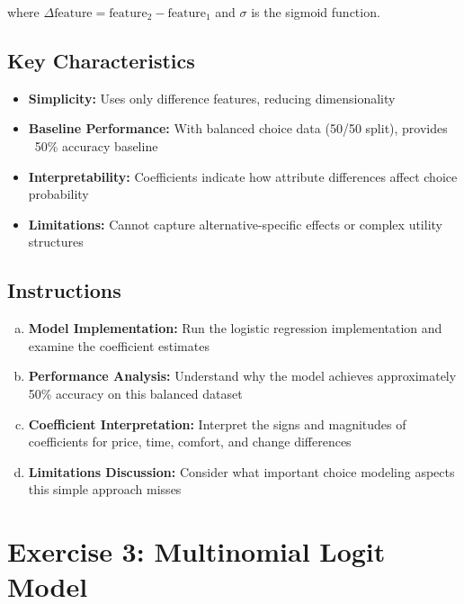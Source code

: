 \documentclass[11pt]{article}
\begin{document}
where $\Delta\text{feature} = \text{feature}_2 - \text{feature}_1$ and $\sigma$ is the sigmoid function.

\subsection*{Key Characteristics}

\begin{itemize}
\item \textbf{Simplicity:} Uses only difference features, reducing dimensionality
\item \textbf{Baseline Performance:} With balanced choice data (50/50 split), provides ~50\% accuracy baseline
\item \textbf{Interpretability:} Coefficients indicate how attribute differences affect choice probability
\item \textbf{Limitations:} Cannot capture alternative-specific effects or complex utility structures
\end{itemize}

\subsection*{Instructions}

\begin{enumerate}[(a)]
\item \textbf{Model Implementation:} Run the logistic regression implementation and examine the coefficient estimates
\item \textbf{Performance Analysis:} Understand why the model achieves approximately 50\% accuracy on this balanced dataset
\item \textbf{Coefficient Interpretation:} Interpret the signs and magnitudes of coefficients for price, time, comfort, and change differences
\item \textbf{Limitations Discussion:} Consider what important choice modeling aspects this simple approach misses
\end{enumerate}

\section*{Exercise 3: Multinomial Logit Model}

\begin{center}
\end{center}
\end{document}
